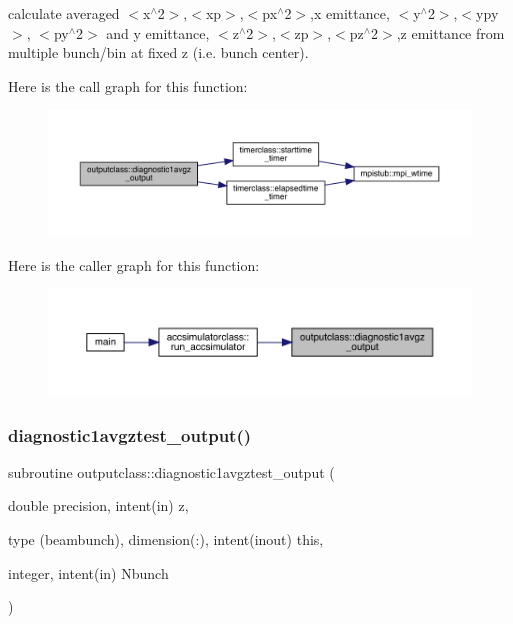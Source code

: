 calculate averaged $<$x$^\wedge$2$>$,$<$xp$>$,$<$px$^\wedge$2$>$,x emittance, $<$y$^\wedge$2$>$,$<$ypy$>$, $<$py$^\wedge$2$>$ and y emittance, $<$z$^\wedge$2$>$,$<$zp$>$,$<$pz$^\wedge$2$>$,z emittance from multiple bunch/bin at fixed z (i.\+e. bunch center). 

Here is the call graph for this function\+:\nopagebreak
\begin{figure}[H]
\begin{center}
\leavevmode
\includegraphics[width=350pt]{namespaceoutputclass_a4a7e188c45ca9b8099c7715873d9324a_cgraph}
\end{center}
\end{figure}
Here is the caller graph for this function\+:\nopagebreak
\begin{figure}[H]
\begin{center}
\leavevmode
\includegraphics[width=350pt]{namespaceoutputclass_a4a7e188c45ca9b8099c7715873d9324a_icgraph}
\end{center}
\end{figure}
\mbox{\label{namespaceoutputclass_a17a23eedc331f6e6b2ca0543119aca42}} 
\subsubsection{\texorpdfstring{diagnostic1avgztest\_output()}{diagnostic1avgztest\_output()}}
{\footnotesize\ttfamily subroutine outputclass\+::diagnostic1avgztest\+\_\+output (\begin{DoxyParamCaption}\item[{double precision, intent(in)}]{z,  }\item[{type (beambunch), dimension(\+:), intent(inout)}]{this,  }\item[{integer, intent(in)}]{Nbunch }\end{DoxyParamCaption})}



